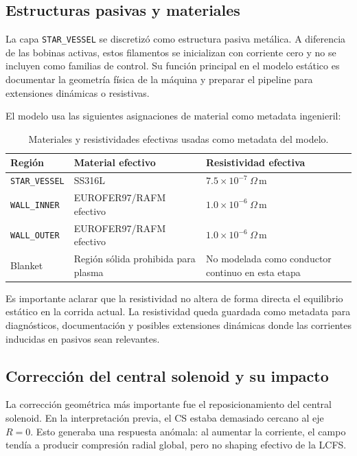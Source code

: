\documentclass[11pt,a4paper]{article}
\begin{document}
\subsection{Estructuras pasivas y materiales}
La capa \texttt{STAR\_VESSEL} se discretizó como estructura pasiva metálica. A diferencia de las
bobinas activas, estos filamentos se inicializan con corriente cero y no se incluyen como
familias de control. Su función principal en el modelo estático es documentar la geometría
física de la máquina y preparar el pipeline para extensiones dinámicas o resistivas.

El modelo usa las siguientes asignaciones de material como metadata ingenieril:

\begin{table}[htbp]
\centering
\caption{Materiales y resistividades efectivas usadas como metadata del modelo.}
\label{tab:materials_metadata}
\begin{tabular}{lll}
\toprule
\textbf{Región} & \textbf{Material efectivo} & \textbf{Resistividad efectiva} \\
\midrule
\texttt{STAR\_VESSEL} & SS316L & $7.5\times10^{-7}~\Omega\,\mathrm{m}$ \\
\texttt{WALL\_INNER} & EUROFER97/RAFM efectivo & $1.0\times10^{-6}~\Omega\,\mathrm{m}$ \\
\texttt{WALL\_OUTER} & EUROFER97/RAFM efectivo & $1.0\times10^{-6}~\Omega\,\mathrm{m}$ \\
Blanket & Región sólida prohibida para plasma & No modelada como conductor continuo en esta etapa \\
\bottomrule
\end{tabular}
\end{table}

Es importante aclarar que la resistividad no altera de forma directa el equilibrio estático en
la corrida actual. La resistividad queda guardada como metadata para diagnósticos, documentación
y posibles extensiones dinámicas donde las corrientes inducidas en pasivos sean relevantes.

\subsection{Corrección del central solenoid y su impacto}
La corrección geométrica más importante fue el reposicionamiento del central solenoid. En la
interpretación previa, el CS estaba demasiado cercano al eje $R=0$. Esto generaba una respuesta
anómala: al aumentar la corriente, el campo tendía a producir compresión radial global, pero no
shaping efectivo de la LCFS.
\end{document}
